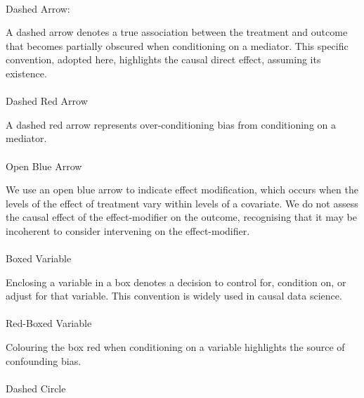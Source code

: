\documentclass[
  single column]{article}
\makeatletter
\let\oldparagraph\paragraph
\renewcommand{\paragraph}{
    \@ifstar
      \xxxParagraphStar
      \xxxParagraphNoStar
  }
\newcommand{\xxxParagraphStar}[1]{\oldparagraph*{#1}\mbox{}}
\newcommand{\xxxParagraphNoStar}[1]{\oldparagraph{#1}\mbox{}}
\makeatother
\begin{document}
\paragraph{Dashed Arrow:}\label{dashed-arrow}

A dashed arrow denotes a true association between the treatment and
outcome that becomes partially obscured when conditioning on a mediator.
This specific convention, adopted here, highlights the causal direct
effect, assuming its existence.

\paragraph{Dashed Red Arrow}\label{dashed-red-arrow}

A dashed red arrow represents over-conditioning bias from conditioning
on a mediator.

\paragraph{Open Blue Arrow}\label{open-blue-arrow}

We use an open blue arrow to indicate effect modification, which occurs
when the levels of the effect of treatment vary within levels of a
covariate. We do not assess the causal effect of the effect-modifier on
the outcome, recognising that it may be incoherent to consider
intervening on the effect-modifier.

\paragraph{Boxed Variable}\label{boxed-variable}

Enclosing a variable in a box denotes a decision to control for,
condition on, or adjust for that variable. This convention is widely
used in causal data science.

\paragraph{Red-Boxed Variable}\label{red-boxed-variable}

Colouring the box red when conditioning on a variable highlights the
source of confounding bias.

\paragraph{Dashed Circle}\label{dashed-circle}
\end{document}
